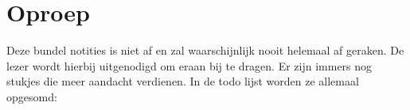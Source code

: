 \documentclass[main.tex]{subfiles}
\begin{document}
\appendix
\chapter{Oproep}
\label{sec:oproep}

Deze bundel notities is niet af en zal waarschijnlijk nooit helemaal af geraken.
De lezer wordt hierbij uitgenodigd om eraan bij te dragen.
Er zijn immers nog {\HUGE {}} stukjes die meer aandacht verdienen.
In de todo lijst worden ze allemaal opgesomd:

\listoftodos
\end{document}
